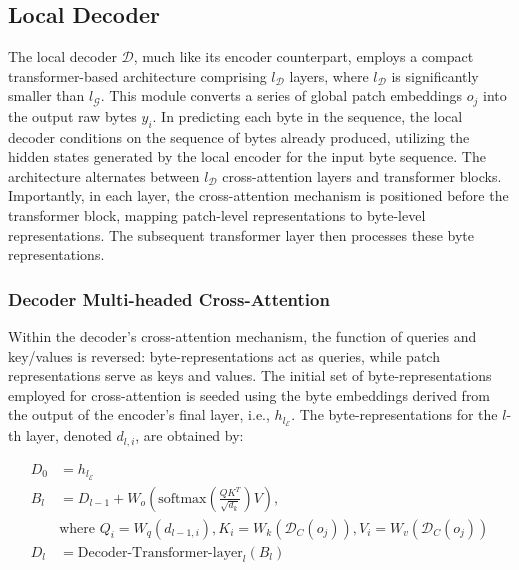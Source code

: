 \subsection{Local Decoder} 

The local decoder $\mathcal{D}$, much like its encoder counterpart, employs a compact transformer-based architecture comprising $l_{\mathcal{D}}$ layers, where $l_{\mathcal{D}}$ is significantly smaller than $l_{\mathcal{G}}$. This module converts a series of global patch embeddings $o_j$ into the output raw bytes $y_i$. In predicting each byte in the sequence, the local decoder conditions on the sequence of bytes already produced, utilizing the hidden states generated by the local encoder for the input byte sequence. The architecture alternates between $l_{\mathcal{D}}$ cross-attention layers and transformer blocks. Importantly, in each layer, the cross-attention mechanism is positioned before the transformer block, mapping patch-level representations to byte-level representations. The subsequent transformer layer then processes these byte representations.

\subsubsection{Decoder Multi-headed Cross-Attention} 

Within the decoder's cross-attention mechanism, the function of queries and key/values is reversed: byte-representations act as queries, while patch representations serve as keys and values. The initial set of byte-representations employed for cross-attention is seeded using the byte embeddings derived from the output of the encoder's final layer, i.e., $h_{l_{\mathcal{E}}}$. The byte-representations for the $l$-th layer, denoted $d_{l,i}$, are obtained by:

\begin{align}
D_0 &= h_{l_{\mathcal{E}}} \\
B_l &= D_{l-1} + W_o\left(\text{softmax}\left(\frac{QK^T}{\sqrt{d_k}}\right)V\right), \\
  &\text{where } Q_i = W_q(d_{l-1,i}), K_i = W_k(\mathcal{D}_C(o_j)), V_i = W_v(\mathcal{D}_C(o_j)) \\
  D_l &= \text{Decoder-Transformer-layer}_l(B_l)
\end{align}

